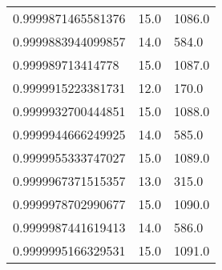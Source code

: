 \begin{center}
\begin{supertabular}[H]{p{0.30\textwidth}p{0.05\textwidth}p{0.05\textwidth}}
0.9999871465581376 & 15.0 & 1086.0 \\ 
0.9999883944099857 & 14.0 & 584.0 \\ 
0.999989713414778 & 15.0 & 1087.0 \\ 
0.9999915223381731 & 12.0 & 170.0 \\ 
0.9999932700444851 & 15.0 & 1088.0 \\ 
0.9999944666249925 & 14.0 & 585.0 \\ 
0.9999955333747027 & 15.0 & 1089.0 \\ 
0.9999967371515357 & 13.0 & 315.0 \\ 
0.9999978702990677 & 15.0 & 1090.0 \\ 
0.9999987441619413 & 14.0 & 586.0 \\ 
0.9999995166329531 & 15.0 & 1091.0 \\ 
\end{supertabular}
\end{center}
